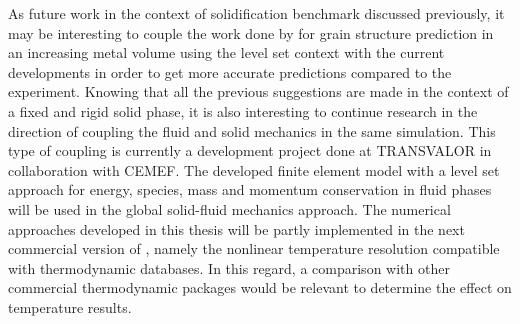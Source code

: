 \newline
As future work in the context of solidification benchmark discussed previously, it may be interesting to 
couple the work done by \citet{chen_3d_2014} for grain structure prediction
in an increasing metal volume using the level set context with the current developments in order to get more
accurate predictions compared to the experiment. Knowing that all the previous suggestions are made in the context
of a fixed and rigid solid phase, it is also interesting to continue research in the direction of coupling the
fluid and solid mechanics in the same simulation.
This type of coupling is currently a development project done at TRANSVALOR in collaboration with CEMEF.
The developed finite element model with a level set approach for energy, species, mass and momentum conservation
in fluid phases will be used in the global solid-fluid mechanics approach.
The numerical approaches developed in this thesis will be partly implemented in the next commercial version
of \thercast, namely the nonlinear temperature resolution compatible with thermodynamic databases. In this regard,
a comparison with other commercial thermodynamic packages would be relevant to determine the effect on temperature results.